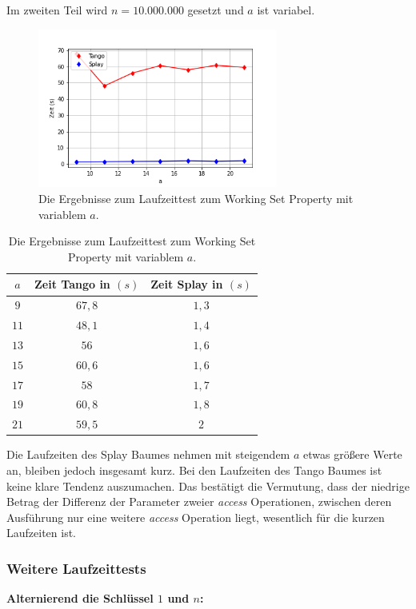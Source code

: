 \documentclass[a4paper,12pt]{article}
\begin{document}
\noindent Im zweiten Teil wird $n = 10.000.000$ gesetzt und $a$ ist variabel. 
\begin{figure}[H]
	\centering
	\includegraphics[width=0.7\textwidth]{Medien/laufzeittest/diagramm/workingset2}
	\caption{Die Ergebnisse zum Laufzeittest zum Working Set Property mit variablem $a$.}
\end{figure}
\begin{table}[H]
	\begin{center}
		\begin{tabular}[c]{|c|c|c|}
			\hline
			$a$ & Zeit Tango in $\left(s\right)$ &Zeit Splay in $\left(s\right)$ \\
			\hline
			$9$  & $67,8$ &$1,3$  \\
			\hline
			$11$  & $48,1$ &$1,4$  \\
			\hline
		    $13$  & $56$ &$1,6$  \\
			\hline
			$15$  & $60,6$ &$1,6$  \\
			\hline
			$17$  & $58$ &$1,7$  \\
			\hline
			$19$  & $60,8$ &$1,8$  \\
			\hline
			$21$  & $59,5$ &$2$  \\
			\hline
		\end{tabular}
		\caption{Die Ergebnisse zum Laufzeittest zum Working Set Property mit variablem $a$.} 
	\end{center}
\end{table}


\noindent Die Laufzeiten des Splay Baumes nehmen mit steigendem $a$ etwas größere Werte an, bleiben jedoch insgesamt kurz. Bei den Laufzeiten des Tango Baumes ist keine klare Tendenz auszumachen. Das bestätigt die Vermutung, dass der niedrige Betrag der Differenz der Parameter zweier \textit{access} Operationen, zwischen deren Ausführung nur eine weitere \textit{access} Operation liegt, wesentlich für die kurzen Laufzeiten ist.     
\newpage
\subsubsection{Weitere Laufzeittests}
\noindent \textbf{Alternierend die Schlüssel $1$ und $n$:\\}
\end{document}
